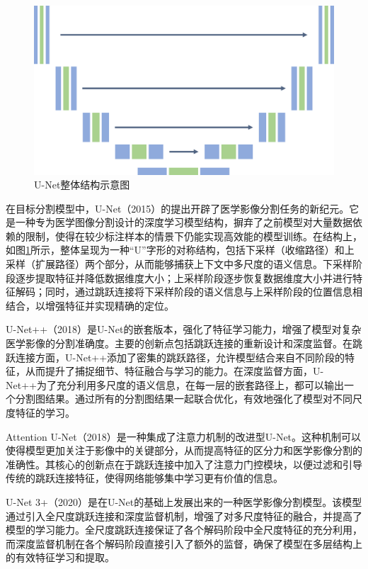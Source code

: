 \begin{figure}[htbp]
    \centering
    \includegraphics[width=\textwidth]{figures/chap02_unet.png}
    \caption{U-Net整体结构示意图}
    \label{fig:chap02_unet}
\end{figure}

在目标分割模型中，U-Net\cite{ronneberger2015u}（2015）的提出开辟了医学影像分割任务的新纪元。它是一种专为医学图像分割设计的深度学习模型结构，摒弃了之前模型对大量数据依赖的限制，使得在较少标注样本的情景下仍能实现高效能的模型训练。在结构上，如图\ref{fig:chap02_unet}所示，整体呈现为一种“U”字形的对称结构，包括下采样（收缩路径）和上采样（扩展路径）两个部分，从而能够捕获上下文中多尺度的语义信息。下采样阶段逐步提取特征并降低数据维度大小；上采样阶段逐步恢复数据维度大小并进行特征解码；同时，通过跳跃连接将下采样阶段的语义信息与上采样阶段的位置信息相结合，以增强特征并实现精确的定位。

U-Net++\cite{zhou2018unet++}（2018）是U-Net\cite{ronneberger2015u}的嵌套版本，强化了特征学习能力，增强了模型对复杂医学影像的分割准确度。主要的创新点包括跳跃连接的重新设计和深度监督。在跳跃连接方面，U-Net++添加了密集的跳跃路径，允许模型结合来自不同阶段的特征，从而提升了捕捉细节、特征融合与学习的能力。在深度监督方面，U-Net++为了充分利用多尺度的语义信息，在每一层的嵌套路径上，都可以输出一个分割图结果。通过所有的分割图结果一起联合优化，有效地强化了模型对不同尺度特征的学习。

Attention U-Net\cite{oktay2018attention}（2018）是一种集成了注意力机制的改进型U-Net\cite{ronneberger2015u}。这种机制可以使得模型更加关注于影像中的关键部分，从而提高特征的区分力和医学影像分割的准确性。其核心的创新点在于跳跃连接中加入了注意力门控模块，以便过滤和引导传统的跳跃连接特征，使得网络能够集中学习更有价值的信息。

U-Net 3+\cite{huang2020unet}（2020）是在U-Net的基础上发展出来的一种医学影像分割模型。该模型通过引入全尺度跳跃连接和深度监督机制，增强了对多尺度特征的融合，并提高了模型的学习能力。全尺度跳跃连接保证了各个解码阶段中全尺度特征的充分利用，而深度监督机制在各个解码阶段直接引入了额外的监督，确保了模型在多层结构上的有效特征学习和提取。

